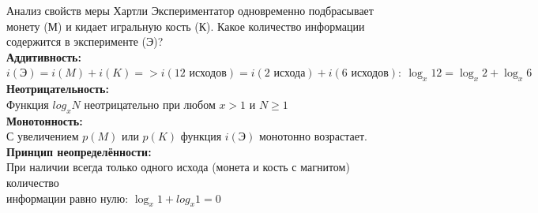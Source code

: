 \documentclass[9pt,aspectratio=169]{beamer}
\begin{document}
	\begin{frame}{Анализ свойств меры Хартли}
		\noindent Экспериментатор одновременно подбрасывает монету (М) и кидает игральную кость (К).
		Какое количество информации содержится в эксперименте (Э)?\\
		\vspace{1.5em}
		\color[rgb]{0.2,0.7,0.4}
		\noindent\textbf{Аддитивность:}\\
		\color{black}
		$i(\mbox{Э})=i(M)+i(K)=>i(\mbox{12 исходов})=i(\mbox{2 исхода})+i(\mbox{6 исходов}):\ \log_x12=\log_x2+\log_x6$\\
		\color[rgb]{0.2,0.7,0.4}
		\noindent\textbf{Неотрицательность:}\\
		\color{black}
		Функция $log_xN$ неотрицательно при любом $x>1$ и $N\geq1$\\
		\color[rgb]{0.2,0.7,0.4}
		\noindent\textbf{Монотонность:}\\
		\color{black}
		С увеличением $p(M)$ или $p(K)$ функция $i(\mbox{Э})$ монотонно возрастает.\\
		\color[rgb]{0.2,0.7,0.4}
		\noindent\textbf{Принцип неопределённости:}\\
		\color{black}
		При наличии всегда только одного исхода (монета и кость с магнитом) количество\\
		информации равно нулю: $\log_x1+log_x1=0$
	\end{frame}
\end{document}
